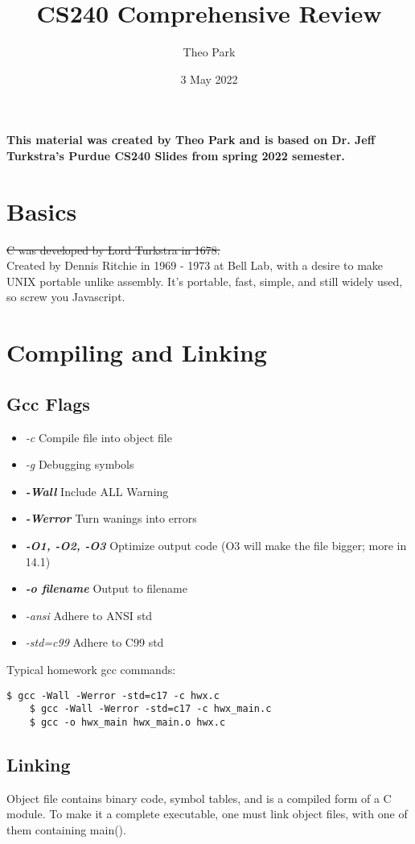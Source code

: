 \documentclass{article}
\title{CS240 Comprehensive Review}
\author{Theo Park}
\date{3 May 2022}
\begin{document}
\maketitle

\pagestyle{fancy}

\textbf{This material was created by Theo Park and is based on Dr. Jeff Turkstra's Purdue CS240 Slides from spring 2022 semester.}

\section{Basics}
\st{C was developed by Lord Turkstra in 1678.}\\
Created by Dennis Ritchie in 1969 - 1973 at Bell Lab, with a desire to make UNIX portable unlike assembly.
It's portable, fast, simple, and still widely used, so screw you Javascript.


\section{Compiling and Linking}

\subsection{Gcc Flags}
\begin{itemize}
    \item \textit{-c} Compile file into object file
    \item \textit{-g} Debugging symbols
    \item \textbf{\textit{-Wall}} Include ALL Warning
    \item \textbf{\textit{-Werror}} Turn wanings into errors
    \item \textbf{\textit{-O1, -O2, -O3}} Optimize output code (O3 will make the file bigger; more in 14.1)
    \item \textbf{\textit{-o filename}} Output to filename
    \item \textit{-ansi} Adhere to ANSI std
    \item \textit{-std=c99} Adhere to C99 std
\end{itemize}
Typical homework gcc commands:
\begin{lstlisting}[style=BashStyle]
    $ gcc -Wall -Werror -std=c17 -c hwx.c
    $ gcc -Wall -Werror -std=c17 -c hwx_main.c
    $ gcc -o hwx_main hwx_main.o hwx.c
\end{lstlisting}

\subsection{Linking}
Object file contains binary code, symbol tables, and is a compiled form of a C module.
To make it a complete executable, one must link object files, with one of them containing main().
\end{document}
